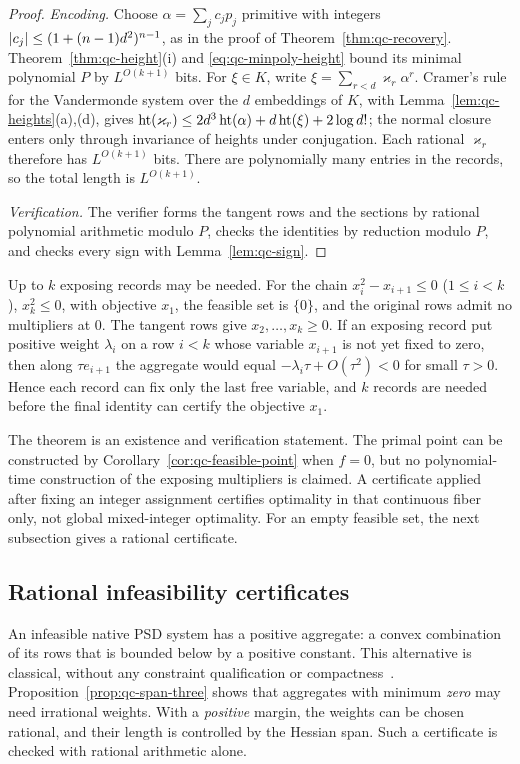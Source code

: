 \begin{proof}
\emph{Encoding.} Choose $\alpha=\sum_jc_jp_j$ primitive with integers
$\left\lvert c_j\right\rvert\le(1+(n-1)d^2)^{n-1}$, as in the proof of
Theorem~\ref{thm:qc-recovery}. Theorem~\ref{thm:qc-height}(i) and
\eqref{eq:qc-minpoly-height} bound its minimal polynomial $P$ by
$L^{O(k+1)}$ bits. For $\xi\in K$, write $\xi=\sum_{r<d}\varkappa_r\alpha^r$.
Cramer's rule for the Vandermonde system over the $d$ embeddings of $K$, with
Lemma~\ref{lem:qc-heights}(a),(d), gives
$\operatorname{ht}(\varkappa_r)\le2d^3\operatorname{ht}(\alpha)+d\operatorname{ht}(\xi)+2\log d!$; the normal
closure enters only through invariance of heights under conjugation. Each
rational $\varkappa_r$ therefore has $L^{O(k+1)}$ bits. There are polynomially
many entries in the records, so the total length is $L^{O(k+1)}$.

\emph{Verification.} The verifier forms the tangent rows and the sections by
rational polynomial arithmetic modulo $P$, checks the identities by reduction
modulo $P$, and checks every sign with Lemma~\ref{lem:qc-sign}.
\end{proof}

Up to $k$ exposing records may be needed. For the chain
$x_i^2-x_{i+1}\le0$ ($1\le i<k$), $x_k^2\le0$, with objective $x_1$, the
feasible set is $\{0\}$, and the original rows admit no multipliers at $0$.
The tangent rows give $x_2,\ldots,x_k\ge0$. If an exposing record put positive
weight $\lambda_i$ on a row $i<k$ whose variable $x_{i+1}$ is not yet fixed to
zero, then along $\tau e_{i+1}$ the aggregate would equal
$-\lambda_i\tau+O(\tau^2)<0$ for small $\tau>0$. Hence each record can fix
only the last free variable, and $k$ records are needed before the final
identity can certify the objective $x_1$.

The theorem is an existence and verification statement. The primal point can
be constructed by Corollary~\ref{cor:qc-feasible-point} when $f=0$, but no
polynomial-time construction of the exposing multipliers is claimed. A
certificate applied after fixing an integer assignment certifies optimality
in that continuous fiber only, not global mixed-integer optimality. For an
empty feasible set, the next subsection gives a rational certificate.

\subsection{Rational infeasibility certificates}
\label{app:qc-infeasible}

An infeasible native PSD system has a positive aggregate: a convex
combination of its rows that is bounded below by a positive constant. This
alternative is classical, without any constraint qualification or
compactness~\cite{JeyakumarLi2014}. Proposition~\ref{prop:qc-span-three}
shows that aggregates with minimum \emph{zero} may need irrational weights.
With a \emph{positive} margin, the weights can be chosen rational, and their
length is controlled by the Hessian span. Such a certificate is checked with
rational arithmetic alone.

